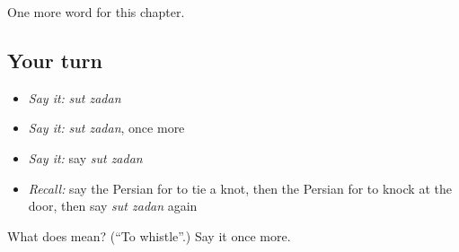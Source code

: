 \begin{grammarlens}[title={What you've built}]
One more word for this chapter.
\end{grammarlens}

\subsection*{Your turn}
\begin{itemize}
\raggedright
  \item \emph{Say it:} \emph{sut zadan}
  \item \emph{Say it:} \emph{sut zadan}, once more
  \item \emph{Say it:} say \emph{sut zadan}
  \item \emph{Recall:} say the Persian for to tie a knot, then the Persian for to knock at the door, then say \emph{sut zadan} again
\end{itemize}

\begin{tcolorbox}[breakable,colback=teal!4,colframe=teal!35!black,title={Before you move on}]
What does   mean? (\textquotedblleft{}To whistle\textquotedblright{}.) Say it once more.
\end{tcolorbox}
